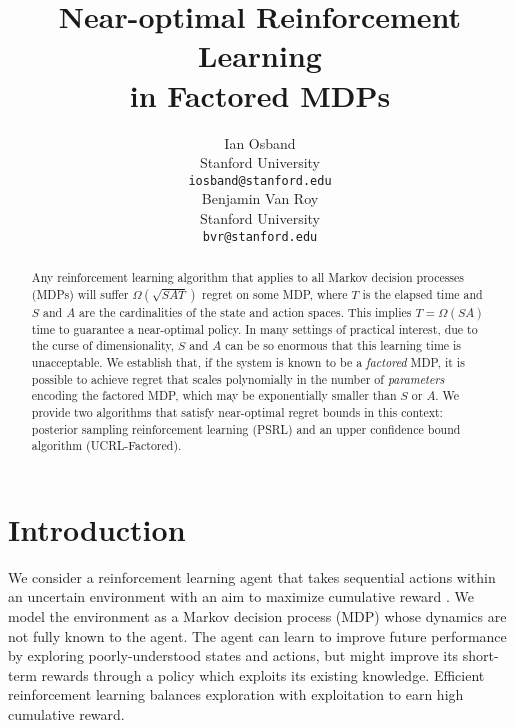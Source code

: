 \documentclass{article}
\title{Near-optimal Reinforcement Learning \\ in Factored MDPs}
\author{
Ian Osband \\
Stanford University\\
\texttt{iosband@stanford.edu} \\
\And
Benjamin Van Roy \\
Stanford University \\
\texttt{bvr@stanford.edu}
}
\begin{document}
\maketitle


\begin{abstract}
Any reinforcement learning algorithm that applies to all Markov decision processes (MDPs) will suffer $\Omega(\sqrt{SAT})$ regret on some MDP, where $T$ is the elapsed time and $S$ and $A$ are the cardinalities of the state and action spaces.
This implies $T = \Omega(SA)$ time to guarantee a near-optimal policy.
In many settings of practical interest, due to the curse of dimensionality, $S$ and $A$ can be so enormous that this learning time is unacceptable.
We establish that, if the system is known to be a \emph{factored} MDP, it is possible to achieve regret that scales polynomially in the number of \emph{parameters} encoding the factored MDP, which may be exponentially smaller than $S$ or $A$.
We provide two algorithms that satisfy near-optimal regret bounds in this context:
posterior sampling reinforcement learning (PSRL) and an upper confidence bound algorithm (UCRL-Factored).
\end{abstract}


\section{Introduction}

We consider a reinforcement learning agent that takes sequential actions within an uncertain environment with an aim to maximize cumulative reward \cite{burnetas1997optimal}.
We model the environment as a Markov decision process (MDP) whose dynamics are not fully known to the agent.
The agent can learn to improve future performance by exploring poorly-understood states and actions, but might improve its short-term rewards through a policy which exploits its existing knowledge.
Efficient reinforcement learning balances exploration with exploitation to earn high cumulative reward.
\end{document}
